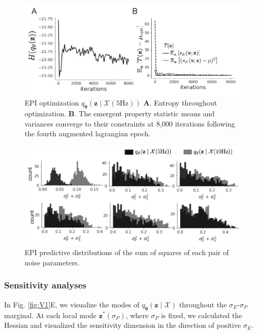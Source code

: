 \documentclass[11pt]{article}
\begin{document}
\begin{figure}[h]
\caption{EPI optimization $q_{\bm{\theta}}(\mathbf{z} \mid \mathcal{X}(5\text{Hz}))$
\textbf{A}. Entropy throughout optimization. 
\textbf{B}. The emergent property statistic means and variances converge to their constraints at 8,000 iterations following the fourth augmented lagrangian epoch.
 }
 \label{fig:V1_2}
\begin{center}
\includegraphics[scale=.8]{figures/figV1_4/figV1_4.pdf}
\end{center}
\end{figure}

\begin{figure}
\caption{EPI predictive distributions of the sum of squares of each pair of noise parameters.
 }
 \label{fig:V1_3}
\begin{center}
\includegraphics[scale=.8]{figures/figV1_2/figV1_2.pdf}
\end{center}
\end{figure}


\subsubsection{Sensitivity analyses}
In Fig. \ref{fig:V1}E, we visualize the modes of $q_{\bm{\theta}}(\mathbf{z} \mid \mathcal{X})$ throughout the $\sigma_E$-$\sigma_P$ marginal.
At each local mode $\mathbf{z}^*(\sigma_P)$, where $\sigma_P$ is fixed, we calculated the Hessian and visualized the sensitivity dimension in the direction of positive $\sigma_E$.
\end{document}
